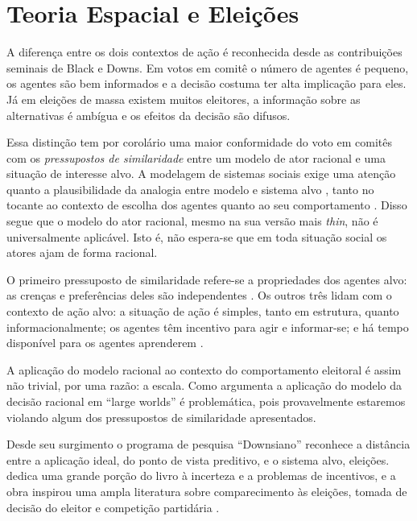 \section{Teoria Espacial e Eleições}


A diferença entre os dois contextos de ação é reconhecida desde as contribuições
seminais de Black e Downs. Em votos em comitê o número de agentes é pequeno, os
agentes são bem informados e  a decisão costuma ter alta implicação para eles.
Já em eleições de massa existem muitos eleitores, a informação sobre as
alternativas é ambígua e os efeitos da decisão são difusos.

Essa distinção tem por corolário uma maior conformidade do voto em comitês com
os \textit{pressupostos de similaridade} entre um modelo de ator racional e uma
situação de interesse alvo. A modelagem de sistemas sociais exige uma atenção
quanto a plausibilidade da analogia entre modelo e sistema alvo
\cite{de2005computational}, tanto no tocante ao contexto de escolha dos agentes
quanto ao seu comportamento \cite{page2008uncertainty}. Disso segue que o modelo
do ator racional, mesmo na sua versão mais \textit{thin}, não é universalmente
aplicável. Isto é, não espera-se que em toda situação social os atores ajam de
forma racional.


O primeiro pressuposto de similaridade refere-se a propriedades dos agentes alvo:
as crenças e preferências deles são independentes \cite{binmore2008rational}. Os
outros três lidam com o contexto de ação alvo: a situação de ação é simples,
tanto em estrutura, quanto informacionalmente; os agentes têm incentivo para
agir e informar-se; e há tempo disponível para os agentes aprenderem
\cite{binmore2007work, page2008uncertainty}.

A aplicação do modelo racional ao contexto do comportamento eleitoral é assim
não trivial, por uma razão: a escala. Como argumenta 
a aplicação do modelo da decisão racional em  ``large worlds'' é problemática,
pois provavelmente estaremos violando algum dos pressupostos de similaridade
apresentados.

Desde seu surgimento o programa de pesquisa ``Downsiano'' reconhece a distância
entre a aplicação ideal, do ponto de vista preditivo, e o sistema alvo,
eleições.  dedica uma grande porção do livro à
incerteza e a problemas de incentivos, e a obra inspirou uma ampla literatura
sobre comparecimento às eleições, tomada de decisão do eleitor e competição
partidária \cite{bendor2011behavioral}.

